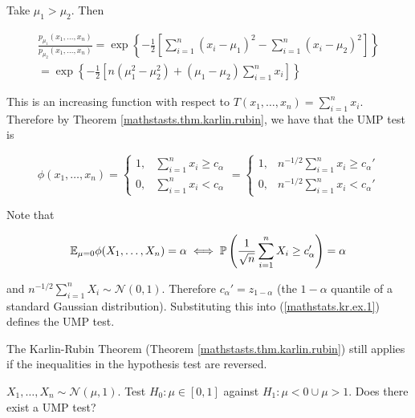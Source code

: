 \begin{solution}

Take \(\mu_1 > \mu_2\). Then 

\begin{multline*}
\frac{ p_{\mu_1}(x_1, \ldots, x_n)}{ p_{\mu_2}(x_1, \ldots, x_n)} = \exp \left\{ - \frac{1}{2} \left[ \sum_{i=1}^n (x_i - \mu_1)^2 -  \sum_{i=1}^n (x_i - \mu_2)^2  \right]\right\}
\\ = \exp \left\{ - \frac{1}{2} \left[ n(\mu_1^2 - \mu_2^2) + (\mu_1 - \mu_2) \sum_{i=1}^n x_i \right]\right\}
\end{multline*} 

This is an increasing function with respect to \(T(x_1, \ldots, x_n) = \sum_{i=1}^n x_i\). Therefore by Theorem \ref{mathstasts.thm.karlin.rubin}, we have that the UMP test is 

\begin{equation}\label{mathstats.kr.ex.1}
\phi(x_1, \ldots, x_n) = \begin{cases}
1, & \sum_{i=1}^n x_i \geq c_\alpha \\
0, & \sum_{i=1}^n x_i < c_\alpha
\end{cases} = \begin{cases}
1, & n^{-1/2} \sum_{i=1}^n x_i \geq c_\alpha' \\
0, & n^{-1/2} \sum_{i=1}^n x_i < c_\alpha'
\end{cases}
\end{equation}

Note that 

\[
\E_{\mu=0} \phi(X_1, \ldots, X_n) = \alpha \iff  \mathbb{P} \left( \frac{1}{\sqrt{n}} \sum_{i=1}^n X_i \geq c_\alpha' \right) = \alpha
\]

and \(n^{-1/2} \sum_{i=1}^n X_i  \sim \mathcal{N}(0,1)\). Therefore \(c_\alpha' = z_{1- \alpha}\) (the \(1-\alpha\) quantile of a standard Gaussian distribution). Substituting this into (\ref{mathstats.kr.ex.1}) defines the UMP test.

\end{solution}

\begin{remark}

The Karlin-Rubin Theorem (Theorem \ref{mathstasts.thm.karlin.rubin}) still applies if the inequalities in the hypothesis test are reversed.

\end{remark}

\begin{example}

\(X_1, \ldots, X_n \sim \mathcal{N}(\mu, 1)\). Test \(H_0: \mu \in [0,1]\) against \(H_1: \mu < 0 \cup \mu > 1\). Does there exist a UMP test?

\end{example}

